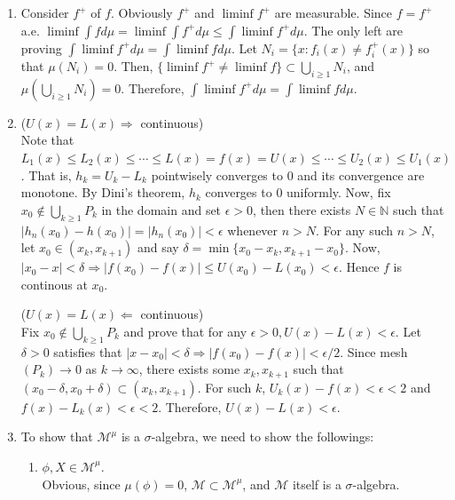 \documentclass{article}
\begin{document}
\begin{enumerate}[font = \Large\bfseries\itshape\space, leftmargin = 3mm, labelsep = 3mm]
\item
Consider $f^+$ of $f$. Obviously $f^+$ and $\liminf f^+$ are measurable.
Since $f = f^+$ a.e. $\liminf \int fd\mu = \liminf \int f^+ d\mu \leq \int \liminf f^+ d\mu$.
The only left are proving $\int \liminf f^+d\mu = \int \liminf fd\mu$.
Let $N_i = \{ x : f_i(x) \neq f_i^+(x)\}$ so that $\mu(N_i) = 0$.
Then, $\{ \liminf f^+ \neq \liminf f\} \subset \bigcup_{i\geq 1} N_i$, and $\mu(\bigcup_{i\geq 1} N_i) = 0$.
Therefore, $\int \liminf f^+ d\mu = \int \liminf f d\mu$.

\item
($U(x) = L(x) \Rightarrow $ continuous)\\
Note that $L_1(x) \leq L_2(x) \leq \cdots \leq L(x) = f(x) = U(x) \leq \cdots \leq U_2(x) \leq U_1(x)$.
That is, $h_k = U_k - L_k$ pointwisely converges to $0$ and its convergence are monotone.
By Dini's theorem, $h_k$ converges to $0$ uniformly.
Now, fix $x_0 \not\in \bigcup_{k\geq 1} P_k$ in the domain and set $\epsilon > 0$, then there exists $N \in \mathbb{N}$ such that
$|h_n(x_0) - h(x_0)| = |h_n(x_0)| < \epsilon$ whenever $n > N$.
For any such $n > N$, let $x_0 \in (x_k, x_{k+1})$ and say $\delta = \min \{ x_0 - x_k, x_{k+1} - x_0 \}$.
Now, $|x_0 - x| < \delta \Rightarrow |f(x_0) - f(x)| \leq U(x_0) - L(x_0) < \epsilon$.
Hence $f$ is continous at $x_0$.

($U(x) = L(x) \Leftarrow $ continuous)\\
Fix $x_0 \not\in \bigcup_{k\geq 1} P_k$ and prove that for any $\epsilon > 0, U(x) - L(x) < \epsilon$.
Let $\delta > 0$ satisfies that $|x - x_0| < \delta \Rightarrow |f(x_0) - f(x)| < \epsilon/2$.
Since mesh$(P_k) \rightarrow 0$ as $k \rightarrow \infty$, there exists some $x_k, x_{k+1}$ such that $(x_0 - \delta, x_0 + \delta) \subset (x_k, x_{k+1})$.
For such $k$, $U_k(x) - f(x) < \epsilon < 2$ and $f(x) - L_k(x) < \epsilon < 2$.
Therefore, $U(x) - L(x) < \epsilon$.

\item
To show that $\mathcal{M}^\mu$ is a $\sigma$-algebra, we need to show the followings:
\begin{enumerate}[label=(\roman*)]
\item
$\phi, X \in \mathcal{M}^\mu$.\\
Obvious, since $\mu(\phi) = 0$, $\mathcal{M} \subset \mathcal{M}^\mu$, and $\mathcal{M}$ itself is a $\sigma$-algebra.


\end{enumerate}
\end{enumerate}
\end{document}
